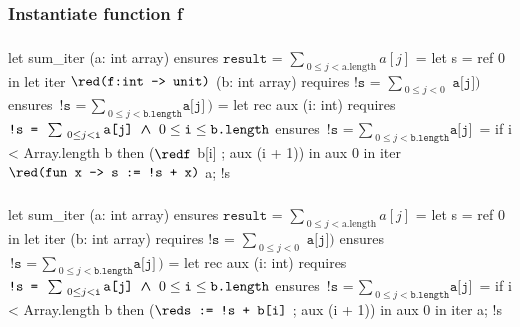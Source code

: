 \subsubsection*{Instantiate function f}
\begin{frame}[fragile]
\frametitle{}
\vspace*{0em}
\begin{footnotesize}
\begin{whycode}
let sum_iter (a: int array) 
ensures { $\texttt{result = }\sum_{~0 \leq j < \text{a.length}} a[j]$ }
= let s = ref 0 in 
  let iter ${\red \texttt{(f:int -> unit)}}$ (b: int array)
  requires { ${ \texttt{!s = } \sum_{~0\leq j < 0} \texttt{ a[j]})}$ } 
  ensures  { ${ \texttt{!s = } \sum_{~0\leq j < \texttt{b.length}} \texttt{a[j]}})$ } 
  = let rec aux (i: int)
    requires { ${ \texttt{!s = } \sum_{~0\leq j < \texttt{i}} \texttt{a[j]}} \boldsymbol{~\wedge~} 0 \leq \texttt{i} \leq \texttt{b.length}$ }
    ensures  { ${ \texttt{!s = } \sum_{~0\leq j < \texttt{b.length}} \texttt{a[j]}}$ }
    = if i < Array.length b
      then (${\red\texttt{f}}$ b[i] ; aux (i + 1)) 
    in aux 0
  in iter ${\red\texttt{(fun x -> s := !s + x)}}$ a; 
  !s
\end{whycode}
\end{footnotesize}
\end{frame}
\addtocounter{framenumber}{-1}

\begin{frame}[fragile]
\frametitle{}
\vspace*{0em}
\begin{footnotesize}
\begin{whycode}
let sum_iter (a: int array) 
ensures { $\texttt{result = }\sum_{~0 \leq j < \text{a.length}} a[j]$ }
= let s = ref 0 in 
  let iter (b: int array)
  requires { ${ \texttt{!s = } \sum_{~0\leq j < 0} \texttt{ a[j]})}$ } 
  ensures  { ${ \texttt{!s = } \sum_{~0\leq j < \texttt{b.length}} \texttt{a[j]}})$ } 
  = let rec aux (i: int)
    requires { ${ \texttt{!s = } \sum_{~0\leq j < \texttt{i}} \texttt{a[j]}} \boldsymbol{~\wedge~} 0 \leq \texttt{i} \leq \texttt{b.length}$ }
    ensures  { ${ \texttt{!s = } \sum_{~0\leq j < \texttt{b.length}} \texttt{a[j]}}$ }
    = if i < Array.length b
      then (${\red\texttt{s := !s + b[i]}}$ ; aux (i + 1)) 
    in aux 0
  in iter a; 
  !s
\end{whycode}
\end{footnotesize}
\end{frame}
\addtocounter{framenumber}{-1}


